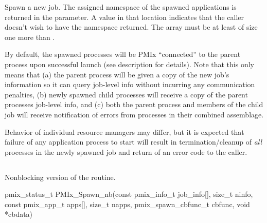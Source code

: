 Spawn a new job.
The assigned namespace of the spawned applications is returned in the  parameter.
A  value in that location indicates that the caller doesn't wish to have the namespace returned.
The  array must be at least of size one more than .

By default, the spawned processes will be PMIx ``connected'' to the parent process upon successful launch (see  description for details).
Note that this only means that (a) the parent process will be given a copy of the new job's
information so it can query job-level info without incurring any communication penalties, (b) newly spawned child processes will receive a copy of the parent processes job-level info, and (c) both the parent process and members of the child job will receive notification of errors from processes in their combined assemblage.

\adviceuserstart
Behavior of individual resource managers may differ, but it is expected that failure of any application process to start will result in termination/cleanup of \emph{all} processes in the newly spawned job and return of an error code to the caller.
\adviceuserend

\subsection{}

\summary

Nonblocking version of the  routine.

\format

\cspecificstart
\begin{codepar}
pmix_status_t
PMIx_Spawn_nb(const pmix_info_t job_info[], size_t ninfo,
              const pmix_app_t apps[], size_t napps,
              pmix_spawn_cbfunc_t cbfunc, void *cbdata)
\end{codepar}
\cspecificend

\begin{arglist}
\end{arglist}

